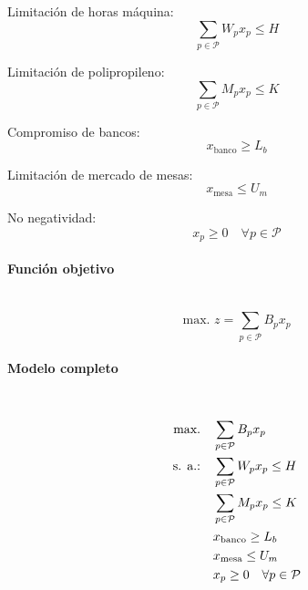 Limitación de horas máquina:
\begin{equation}
    \sum_{p \in \mathcal{P}} W_p x_p \leq H
\end{equation}

Limitación de polipropileno:
\begin{equation}
    \sum_{p \in \mathcal{P}} M_p x_p \leq K
\end{equation}

Compromiso de bancos:
\begin{equation}
    x_{\text{banco}} \geq L_b
\end{equation}

Limitación de mercado de mesas:
\begin{equation}
    x_{\text{mesa}} \leq U_m
\end{equation}

No negatividad:
\begin{equation}
    x_p \geq 0 \quad \forall p \in \mathcal{P}
\end{equation}

\paragraph{Función objetivo}\mbox{}\\
\begin{equation}
    \mbox{max. } z = \sum_{p \in \mathcal{P}} B_p x_p
\end{equation}

\paragraph{Modelo completo}\mbox{}\\
\begin{align}
\mbox{max.} \quad & \sum_{p \in \mathcal{P}} B_p x_p \notag \\
\mbox{s. a.:} \quad & \sum_{p \in \mathcal{P}} W_p x_p \leq H \notag \\
             & \sum_{p \in \mathcal{P}} M_p x_p \leq K \notag \\
             & x_{\text{banco}} \geq L_b \notag \\
             & x_{\text{mesa}} \leq U_m \notag \\
             & x_p \geq 0 \quad \forall p \in \mathcal{P} \notag
\end{align}
